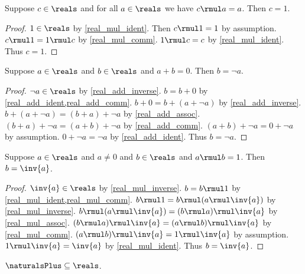\begin{theorem}\label{real_mul_ident_unique}
    Suppose $c\in\reals$ and for all $a\in\reals$ we have $c \rmul a = a$.
    Then $c = 1$.
\end{theorem}
\begin{proof}
    $1\in\reals$ by \cref{real_mul_ident}.
    Then $c \rmul 1 = 1$ by assumption.
    $c \rmul 1 = 1 \rmul c$ by \cref{real_mul_comm}.
    $1 \rmul c = c$ by \cref{real_mul_ident}.
    Thus $c = 1$.
\end{proof}

\begin{theorem}\label{real_add_inverse_unique}
    Suppose $a\in\reals$ and $b\in\reals$ and $a + b = 0$.
    Then $b = \neg{a}$.
\end{theorem}
\begin{proof}
    $\neg{a}\in\reals$ by \cref{real_add_inverse}.
    $b = b + 0$ by \cref{real_add_ident,real_add_comm}.
    $b + 0 = b + (a + \neg{a})$ by \cref{real_add_inverse}.
    $b + (a + \neg{a}) = (b + a) + \neg{a}$ by \cref{real_add_assoc}.
    $(b + a) + \neg{a} = (a + b) + \neg{a}$ by \cref{real_add_comm}.
    $(a + b) + \neg{a} = 0 + \neg{a}$ by assumption.
    $0 + \neg{a} = \neg{a}$ by \cref{real_add_ident}.
    Thus $b = \neg{a}$.
\end{proof}

\begin{theorem}\label{real_mul_inverse_unique}
    Suppose $a\in\reals$ and $a\neq 0$ and $b\in\reals$ and $a \rmul b = 1$.
    Then $b = \inv{a}$.
\end{theorem}
\begin{proof}
    $\inv{a}\in\reals$ by \cref{real_mul_inverse}.
    $b = b \rmul 1$ by \cref{real_mul_ident,real_mul_comm}.
    $b \rmul 1 = b \rmul (a \rmul \inv{a})$ by \cref{real_mul_inverse}.
    $b \rmul (a \rmul \inv{a}) = (b \rmul a) \rmul \inv{a}$ by \cref{real_mul_assoc}.
    $(b \rmul a) \rmul \inv{a} = (a \rmul b) \rmul \inv{a}$ by \cref{real_mul_comm}.
    $(a \rmul b) \rmul \inv{a} = 1 \rmul \inv{a}$ by assumption.
    $1 \rmul \inv{a} = \inv{a}$ by \cref{real_mul_ident}.
    Thus $b = \inv{a}$.
\end{proof}

\begin{axiom}\label{real_naturals_subset_reals}
    $\naturalsPlus \subseteq \reals$.
\end{axiom}

